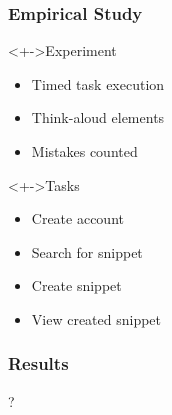 
\begin{frame}
  \frametitle{Empirical Study}

  \begin{block}<+->{Experiment}
    \begin{itemize}
      \item Timed task execution
      \item Think-aloud elements
      \item Mistakes counted
    \end{itemize}
  \end{block}

  \begin{block}<+->{Tasks}
    \begin{itemize}
      \item Create account
      \item Search for snippet
      \item Create snippet
      \item View created snippet
    \end{itemize}
  \end{block}
\end{frame}

\begin{frame}
  \frametitle{Results}

  \center \huge ?
\end{frame}